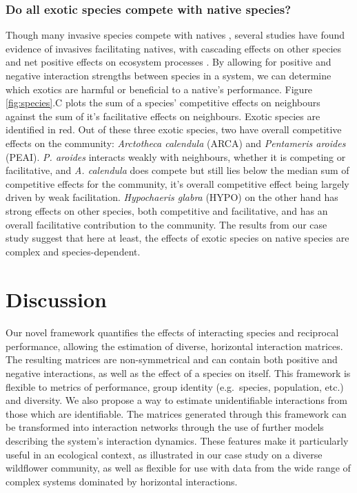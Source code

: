 \documentclass[a4,12pt]{article}
\begin{document}
    \subsubsection*{Do all exotic species compete with native species?}
    Though many invasive species compete with natives \parencite{Naeem2000, Corbin2004, Riley2008, Zheng2015}, several studies have found evidence of invasives facilitating natives, with cascading effects on other species and net positive effects on ecosystem processes \parencite{Rodriguez2006, Ramus2017, Wainwright2019}. By allowing for positive and negative interaction strengths between species in a system, we can determine which exotics are harmful or beneficial to a native's performance. Figure \ref{fig:species}.C plots the sum of a species' competitive effects on neighbours against the sum of it's facilitative effects on neighbours. Exotic species are identified in red. Out of these three exotic species, two have overall competitive effects on the community: \textit{Arctotheca calendula} (ARCA) and \textit{Pentameris aroides} (PEAI). \textit{P. aroides} interacts weakly with neighbours, whether it is competing or facilitative, and \textit{A. calendula} does compete but still lies below the median sum of competitive effects for the community, it's overall competitive effect being largely driven by weak facilitation. \textit{Hypochaeris glabra} (HYPO) on the other hand has strong effects on other species, both competitive and facilitative, and has an overall facilitative contribution to the community. The results from our case study suggest that here at least, the effects of exotic species on native species are complex and species-dependent.

    

\section{Discussion}


    \paragraph{} 
    Our novel framework quantifies the effects of interacting species and reciprocal performance, allowing the estimation of diverse, horizontal interaction matrices. The resulting matrices are non-symmetrical and can contain both positive and negative interactions, as well as the effect of a species on itself. This framework is flexible to metrics of performance, group identity (e.g.\ species, population, etc.) and diversity. We also propose a way to estimate unidentifiable interactions from those which are identifiable. The matrices generated through this framework can be transformed into interaction networks through the use of further models describing the system's interaction dynamics. These features make it particularly useful in an ecological context, as illustrated in our case study on a diverse wildflower community, as well as flexible for use with data from the wide range of complex systems dominated by horizontal interactions.
\end{document}
